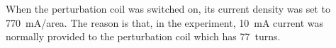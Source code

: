 




When the perturbation coil was switched on, its current density was set to 770~mA/area.  The reason is that, in the experiment, 10~mA
current was normally provided to the perturbation coil which has
77~turns.




